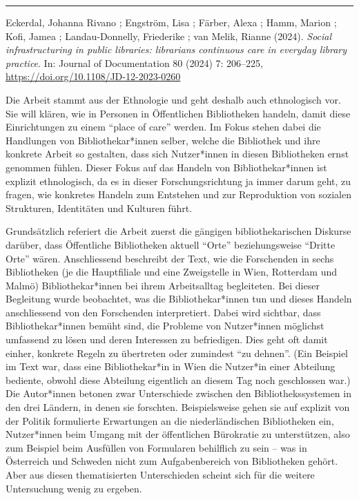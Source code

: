 \documentclass[a4paper,
fontsize=11pt,
oneside,
numbers=noperiodatend,
parskip=half-,
bibliography=totoc,
final
]{scrartcl}
\begin{document}
\begin{center}\rule{0.5\linewidth}{0.5pt}\end{center}

Eckerdal, Johanna Rivano ; Engström, Lisa ; Färber, Alexa ; Hamm, Marion
; Kofi, Jamea ; Landau-Donnelly, Friederike ; van Melik, Rianne (2024).
\emph{Social infrastructuring in public libraries:
librarians\textquotesingle{} continuous care in everyday library
practice}. In: Journal of Documentation 80 (2024) 7: 206--225,
\url{https://doi.org/10.1108/JD-12-2023-0260}

Die Arbeit stammt aus der Ethnologie und geht deshalb auch ethnologisch
vor. Sie will klären, wie in Personen in Öffentlichen Bibliotheken
handeln, damit diese Einrichtungen zu einem \enquote{place of care} werden. Im
Fokus stehen dabei die Handlungen von Bibliothekar*innen selber, welche
die Bibliothek und ihre konkrete Arbeit so gestalten, dass sich
Nutzer*innen in diesen Bibliotheken ernst genommen fühlen. Dieser Fokus
auf das Handeln von Bibliothekar*innen ist explizit ethnologisch, da es
in dieser Forschungsrichtung ja immer darum geht, zu fragen, wie
konkretes Handeln zum Entstehen und zur Reproduktion von sozialen
Strukturen, Identitäten und Kulturen führt.

Grundsätzlich referiert die Arbeit zuerst die gängigen
bibliothekarischen Diskurse darüber, dass Öffentliche Bibliotheken
aktuell \enquote{Orte} beziehungsweise \enquote{Dritte Orte} wären. Anschliessend
beschreibt der Text, wie die Forschenden in sechs Bibliotheken (je die
Hauptfiliale und eine Zweigstelle in Wien, Rotterdam und Malmö)
Bibliothekar*innen bei ihrem Arbeitsalltag begleiteten. Bei dieser
Begleitung wurde beobachtet, was die Bibliothekar*innen tun und dieses
Handeln anschliessend von den Forschenden interpretiert. Dabei wird
sichtbar, dass Bibliothekar*innen bemüht sind, die Probleme von
Nutzer*innen möglichst umfassend zu lösen und deren Interessen zu
befriedigen. Dies geht oft damit einher, konkrete Regeln zu übertreten
oder zumindest \enquote{zu dehnen}. (Ein Beispiel im Text war, dass eine
Bibliothekar*in in Wien die Nutzer*in einer Abteilung bediente, obwohl
diese Abteilung eigentlich an diesem Tag noch geschlossen war.) Die
Autor*innen betonen zwar Unterschiede zwischen den Bibliothekssystemen
in den drei Ländern, in denen sie forschten. Beispielsweise gehen sie
auf explizit von der Politik formulierte Erwartungen an die
niederländischen Bibliotheken ein, Nutzer*innen beim Umgang mit der
öffentlichen Bürokratie zu unterstützen, also zum Beispiel beim
Ausfüllen von Formularen behilflich zu sein -- was in Österreich und
Schweden nicht zum Aufgabenbereich von Bibliotheken gehört. Aber aus
diesen thematisierten Unterschieden scheint sich für die weitere
Untersuchung wenig zu ergeben.
\end{document}
